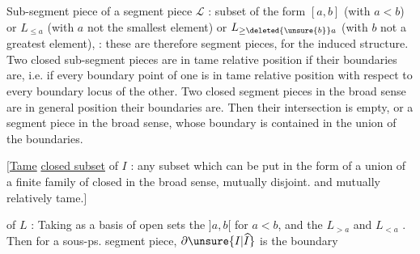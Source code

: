 Sub-segment piece  of a segment piece $\mathcal L$ : subset of the form $[a,b]$ (with $a<b$) or $L_{\leq a}$ (with $a$ not the smallest element) or $L_{\geq\deleted{\unsure{b}}a}$ (with $b$ not a greatest element),  : these are therefore segment pieces, for the induced  structure.
 Two closed sub-segment pieces are  in tame relative position if their boundaries are, i.e. if every  boundary point of one is in tame relative position with respect to every boundary locus of the other.
  Two closed segment pieces in the broad sense are in general position  their boundaries  are.
Then their intersection is empty,  or a  segment piece in the broad sense, whose boundary is contained in  the union of the boundaries.

$\bigl[$\uline{Tame} \uline{closed subset} of $I$ : any subset which can be put in the form of a union of a finite family of  closed in the broad sense, mutually disjoint. and mutually  relatively tame.$\bigr]$

 of $L$  : Taking as a basis of open sets the  $]a,b[$ for $a<b$, and the $L_{>a}$ and $L_{<a}$ \unsure{(}. Then  for a  sous-ps. segment piece, $\partial\unsure{I|\widehat I}$ is the boundary
\margin{\uline{NB} There is no need to introduce the $L_{>a}$ \unsure{and} if $L$ \unsure{has} no greatest element, and ditto for $L_{<a}$ if \unsure{$a$|$L$} has no small\unsure{est} element. \unsure{In this case|In} \illegible{2} $]a,b[$.}

